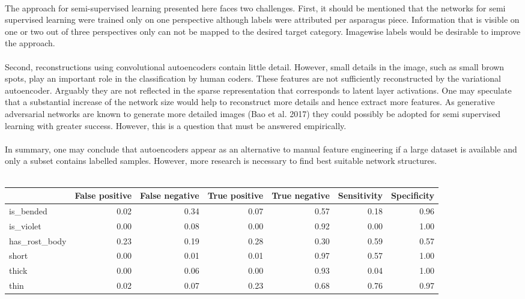 \\
The approach for semi-supervised learning presented here faces two challenges. First, it should be mentioned that the networks for semi supervised learning were trained only on one perspective although labels were attributed per asparagus piece. Information that is visible on one or two out of three perspectives only can not be mapped to the desired target category. Imagewise labels would be desirable to improve the approach. \\
\\
Second, reconstructions using convolutional autoencoders contain little detail. However, small details in the image, such as small brown spots, play an important role in the classification by human coders. These features are not sufficiently reconstructed by the variational autoencoder. Arguably they are not reflected in the sparse representation that corresponds to latent layer activations. One may speculate that a substantial increase of the network size would help to reconstruct more details and hence extract more features. As generative adversarial networks are known to generate more detailed images (Bao et al. 2017) they could possibly be adopted for semi supervised learning with greater success. However, this is a question that must be answered empirically. \\
\\
In summary, one may conclude that autoencoders appear as an alternative to manual feature engineering if a large dataset is available and only a subset contains labelled samples. However, more research is necessary to find best suitable network structures.\\
\\
\begin{tabular}{lrrrrrr}
\toprule
{} &  False positive &  False negative &  True positive &  True negative &  Sensitivity &  Specificity \\
\midrule
is\_bended     &            0.02 &            0.34 &           0.07 &           0.57 &         0.18 &         0.96 \\
is\_violet     &            0.00 &            0.08 &           0.00 &           0.92 &         0.00 &         1.00 \\
has\_rost\_body &            0.23 &            0.19 &           0.28 &           0.30 &         0.59 &         0.57 \\
short         &            0.00 &            0.01 &           0.01 &           0.97 &         0.57 &         1.00 \\
thick         &            0.00 &            0.06 &           0.00 &           0.93 &         0.04 &         1.00 \\
thin          &            0.02 &            0.07 &           0.23 &           0.68 &         0.76 &         0.97 \\
\bottomrule
\end{tabular}
